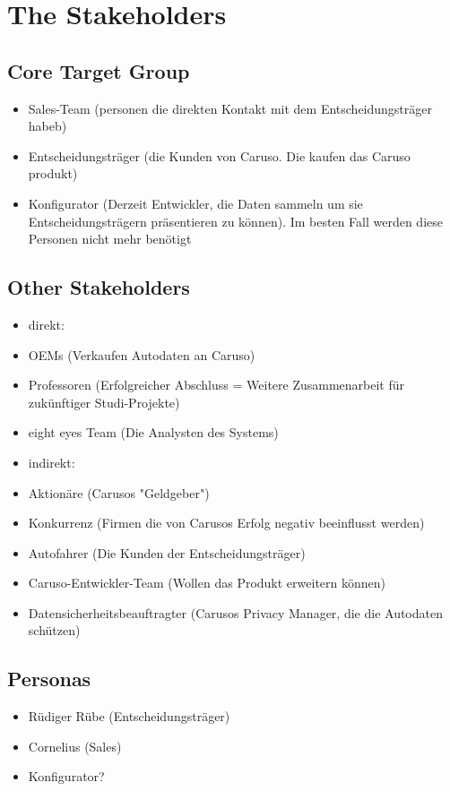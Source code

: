\chapter{The Stakeholders}

\section{Core Target Group}
\begin{itemize}
  \item Sales-Team (personen die direkten Kontakt mit dem Entscheidungsträger habeb)
  \item Entscheidungsträger (die Kunden von Caruso. Die kaufen das Caruso produkt)
  \item Konfigurator (Derzeit Entwickler, die Daten sammeln um sie Entscheidungsträgern präsentieren zu können). Im besten Fall werden diese Personen nicht mehr benötigt
\end{itemize}

\section{Other Stakeholders}
\begin{itemize}
  \item direkt:
  \item OEMs (Verkaufen Autodaten an Caruso)
  \item Professoren (Erfolgreicher Abschluss = Weitere Zusammenarbeit für zukünftiger Studi-Projekte)
  \item eight eyes Team (Die Analysten des Systems)
  \item indirekt:
  \item Aktionäre (Carusos "Geldgeber")
  \item Konkurrenz (Firmen die von Carusos Erfolg negativ beeinflusst werden)
  \item Autofahrer (Die Kunden der Entscheidungsträger)
  \item Caruso-Entwickler-Team (Wollen das Produkt erweitern können)
  \item Datensicherheitsbeauftragter (Carusos Privacy Manager, die die Autodaten schützen)
\end{itemize}

\section{Personas}
\begin{itemize}
  \item Rüdiger Rübe (Entscheidungsträger)
  \item Cornelius (Sales)
  \item Konfigurator?
\end{itemize}